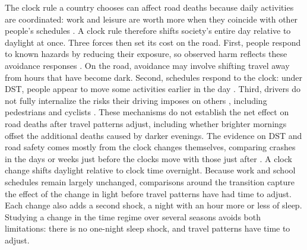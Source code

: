 The clock rule a country chooses can affect road deaths because daily activities are coordinated: work and leisure are worth more when they coincide with other people's schedules \citep{hamermesh2008cues}. A clock rule therefore shifts society's entire day relative to daylight at once. Three forces then set its cost on the road. First, people respond to known hazards by reducing their exposure, so observed harm reflects these avoidance responses \citep{neidell2009information}. On the road, avoidance may involve shifting travel away from hours that have become dark. Second, schedules respond to the clock: under DST, people appear to move some activities earlier in the day \citep{sexton2014behavioral}. Third, drivers do not fully internalize the risks their driving imposes on others \citep{edlin2006accident}, including pedestrians and cyclists \citep{crandall1984automobile, white2004arms}. These mechanisms do not establish the net effect on road deaths after travel patterns adjust, including whether brighter mornings offset the additional deaths caused by darker evenings. The evidence on DST and road safety comes mostly from the clock changes themselves, comparing crashes in the days or weeks just before the clocks move with those just after \citep{sullivan2002role, sood2007short, smith2016spring, laliotis2023summertime, gillmore2025daylight}. A clock change shifts daylight relative to clock time overnight. Because work and school schedules remain largely unchanged, comparisons around the transition capture the effect of the change in light before travel patterns have had time to adjust. Each change also adds a second shock, a night with an hour more or less of sleep. Studying a change in the time regime over several seasons avoids both limitations: there is no one-night sleep shock, and travel patterns have time to adjust.

